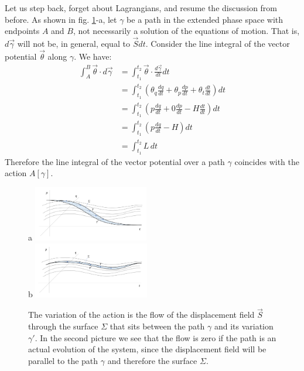 \documentclass[10pt,twocolumn, nofootinbib]{revtex4-2}
\begin{document}
Let us step back, forget about Lagrangians, and resume the discussion from before. As shown in fig. \ref{action}-a, let $\gamma$ be a path in the extended phase space with endpoints $A$ and $B$, not necessarily a solution of the equations of motion. That is, $d\vec{\gamma}$ will not be, in general, equal to $\vec{S}dt$. Consider the line integral of the vector potential $\vec{\theta}$ along $\gamma$. We have:
\begin{equation}
\begin{aligned}
	\int_A^B \vec{\theta} \cdot d\vec{\gamma} &= \int^{t_2}_{t_1} \vec{\theta} \cdot \frac{d\vec{\gamma}}{dt} dt \\
	&= \int^{t_2}_{t_1} \left(\theta_q \frac{dq}{dt} + \theta_p \frac{dp}{dt} + \theta_t \frac{dt}{dt}\right) dt \\
	&= \int^{t_2}_{t_1} \left(p \frac{dq}{dt} + 0 \frac{dp}{dt} - H \frac{dt}{dt}\right) dt \\
	&= \int^{t_2}_{t_1} \left(p \frac{dq}{dt} - H\right) dt \\
	&= \int^{t_2}_{t_1} L \, dt
\end{aligned}
\end{equation}
Therefore the line integral of the vector potential over a path $\gamma$ coincides with the action $A[\gamma]$.

\begin{figure}
	a \includegraphics[width = 0.45\textwidth]{ActionNonOptimized.png} \\
	b \includegraphics[width = 0.45\textwidth]{ActionOptimized.png}
	\caption{\footnotesize{The variation of the action is the flow of the displacement field $\vec{S}$ through the surface $\Sigma$ that sits between the path $\gamma$ and its variation $\gamma'$. In the second picture we see that the flow is zero if the path is an actual evolution of the system, since the displacement field will be parallel to the path $\gamma$ and therefore the surface $\Sigma$.}}\label{action}
\end{figure}
\end{document}
